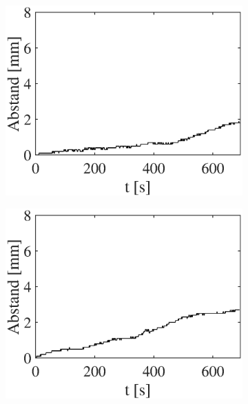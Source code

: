 \documentclass[doc,a4paper,12pt]{apa6}
\begin{document}
\begin{figure}
  \captionsetup{justification=centering}
  \begin{subfigure}[c]{0.23\textwidth}
    \includegraphics[width=\textwidth]{ergebnisse/movement/pa07a1_mc_dist_movement.eps}
    \label{img:bewegung:pa07:1}
  \end{subfigure}\hspace*{0.02\textwidth}
  \begin{subfigure}[c]{0.23\textwidth}
    \includegraphics[width=\textwidth]{ergebnisse/movement/pa07a3_mc_dist_movement.eps}

\end{subfigure}
\end{figure}
\end{document}
